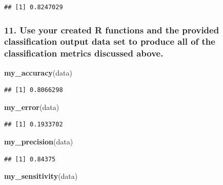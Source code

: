 \documentclass[]{article}
\newenvironment{Shaded}{\begin{snugshade}}{\end{snugshade}}
\newcommand{\KeywordTok}[1]{\textcolor[rgb]{0.13,0.29,0.53}{\textbf{{#1}}}}
\newcommand{\NormalTok}[1]{{#1}}
\begin{document}
\begin{Shaded}
\end{Shaded}

\begin{verbatim}
## [1] 0.8247029
\end{verbatim}

\subsubsection{11. Use your created R functions and the provided
classification output data set to produce all of the classification
metrics discussed
above.}\label{use-your-created-r-functions-and-the-provided-classification-output-data-set-to-produce-all-of-the-classification-metrics-discussed-above.}

\begin{Shaded}
\begin{Highlighting}[]
\KeywordTok{my_accuracy}\NormalTok{(data)}
\end{Highlighting}
\end{Shaded}

\begin{verbatim}
## [1] 0.8066298
\end{verbatim}

\begin{Shaded}
\begin{Highlighting}[]
\KeywordTok{my_error}\NormalTok{(data)}
\end{Highlighting}
\end{Shaded}

\begin{verbatim}
## [1] 0.1933702
\end{verbatim}

\begin{Shaded}
\begin{Highlighting}[]
\KeywordTok{my_precision}\NormalTok{(data)}
\end{Highlighting}
\end{Shaded}

\begin{verbatim}
## [1] 0.84375
\end{verbatim}

\begin{Shaded}
\begin{Highlighting}[]
\KeywordTok{my_sensitivity}\NormalTok{(data)}
\end{Highlighting}
\end{Shaded}
\end{document}
